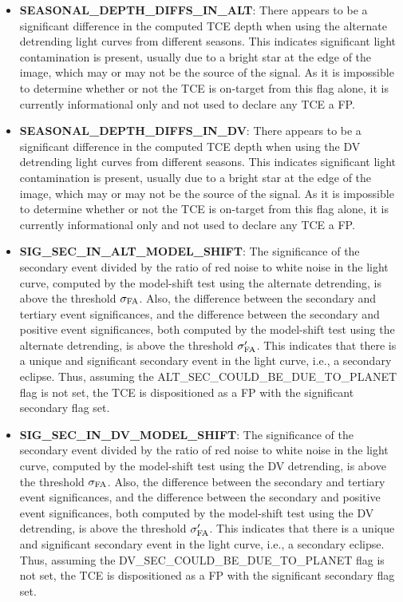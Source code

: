 \begin{itemize}
\item[] \textbf{SEASONAL\_DEPTH\_DIFFS\_IN\_ALT}: There appears to be a significant difference in the computed TCE depth when using the alternate detrending light curves from different seasons. This indicates significant light contamination is present, usually due to a bright star at the edge of the image, which may or may not be the source of the signal. As it is impossible to determine whether or not the TCE is on-target from this flag alone, it is currently informational only and not used to declare any TCE a FP.
\item[] \textbf{SEASONAL\_DEPTH\_DIFFS\_IN\_DV}: There appears to be a significant difference in the computed TCE depth when using the DV detrending light curves from different seasons. This indicates significant light contamination is present, usually due to a bright star at the edge of the image, which may or may not be the source of the signal. As it is impossible to determine whether or not the TCE is on-target from this flag alone, it is currently informational only and not used to declare any TCE a FP.  
\item[] \textbf{SIG\_SEC\_IN\_ALT\_MODEL\_SHIFT}: The significance of the secondary event divided by the ratio of red noise to white noise in the light curve, computed by the model-shift test using the alternate detrending, is above the threshold $\sigma_{\rm FA}$. Also, the difference between the secondary and tertiary event significances, and the difference between the secondary and positive event significances, both computed by the model-shift test using the alternate detrending, is above the threshold $\sigma'_{\rm FA}$. This indicates that there is a unique and significant secondary event in the light curve, i.e., a secondary eclipse. Thus, assuming the ALT\_SEC\_COULD\_BE\_DUE\_TO\_PLANET flag is not set, the TCE is dispositioned as a FP with the significant secondary flag set.
\item[] \textbf{SIG\_SEC\_IN\_DV\_MODEL\_SHIFT}: The significance of the secondary event divided by the ratio of red noise to white noise in the light curve, computed by the model-shift test using the DV detrending, is above the threshold $\sigma_{\rm FA}$. Also, the difference between the secondary and tertiary event significances, and the difference between the secondary and positive event significances, both computed by the model-shift test using the DV detrending, is above the threshold $\sigma'_{\rm FA}$. This indicates that there is a unique and significant secondary event in the light curve, i.e., a secondary eclipse. Thus, assuming the DV\_SEC\_COULD\_BE\_DUE\_TO\_PLANET flag is not set, the TCE is dispositioned as a FP with the significant secondary flag set.

\end{itemize}

